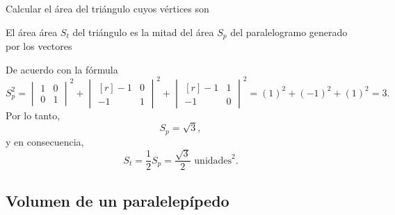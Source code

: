 \begin{examplebox}{}{}
    Calcular el área del triángulo cuyos vértices son
    \begin{matrizn}
    \end{matrizn}

    \tcblower
    \solucion El área área $S_t$ del triángulo es la mitad del área $S_p$ del paralelogramo generado por los vectores
    \begin{matrizn}
    \end{matrizn}
    De acuerdo con la fórmula
    $$S_p^2 = \begin{vmatrix}
        1 & 0 \\
        0 & 1
    \end{vmatrix}^2 + \begin{vmatrix*}[r]
        -1 & 0 \\
        -1 & 1
    \end{vmatrix*}^2 + \begin{vmatrix*}[r]
        -1 & 1 \\
        -1 & 0
    \end{vmatrix*}^2 = (1)^2 + (-1)^2 + (1)^2 = 3.$$
    Por lo tanto,
    $$S_p = \sqrt{3},$$
    y en consecuencia,
    $$S_t = \frac{1}{2} S_p = \frac{\sqrt{3}}{2} \text{ unidades}^2.$$
\end{examplebox}

\newpage

\subsection*{Volumen de un paralelepípedo}

